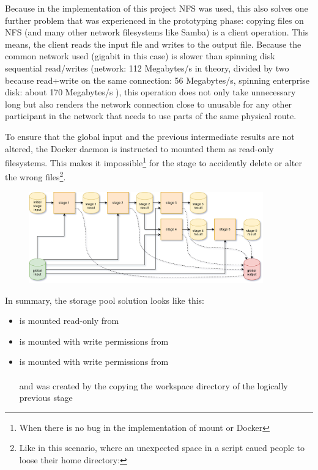 Because in the implementation of this project NFS was used, this also solves one further problem that was experienced in the prototyping phase: copying files on NFS (and many other network filesystems like Samba) is a client operation.
This means, the client reads the input file and writes to the output file.
Because the common network used (gigabit in this case) is slower than spinning disk sequential read/writes (network: 112 Megabytes/s in theory, divided by two because read+write on the same connection: 56 Megabytes/s, spinning enterprise disk: about 170 Megabytes/s ), this operation does not only take unnecessary long but also renders the network connection close to unusable for any other participant in the network that needs to use parts of the same physical route.

To ensure that the global input and the previous intermediate results are not altered, the Docker daemon is instructed to mounted them as read-only filesystems.
This makes it impossible\footnote{When there is no bug in the implementation of mount or Docker} for the stage to accidently delete or alter the wrong files\footnote{Like in this scenario, where an unexpected space in a script caued people to loose their home directory: }.


\begin{figure}[H]
	\centering
	\includegraphics[width=0.9\textwidth]{stage-storage.png}
\end{figure}

In summary, the storage pool solution looks like this:

\begin{itemize}
	\item {} is mounted read-only from \\ 
	\item {} is mounted with write permissions from \\ 
	\item {} is mounted with write permissions from \\  \\
	and was created by the copying the workspace directory of the logically previous stage
\end{itemize}

